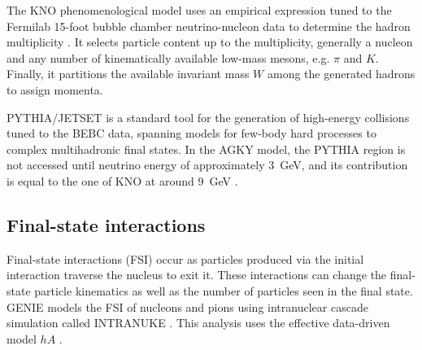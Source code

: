 
The KNO phenomenological model \cite{KNO_KOBA1972317} uses an empirical expression tuned to the Fermilab 15-foot bubble chamber neutrino-nucleon data to determine the hadron multiplicity \cite{AGKY_Yang_2009}. It selects particle content up to the multiplicity, generally a nucleon and any number of kinematically available low-mass mesons, e.g. $\pi$ and $K$. Finally, it partitions the available invariant mass $W$ among the generated hadrons to assign momenta. 

PYTHIA/JETSET \cite{Pythia_Sjostrand_2001} is a standard tool for the generation of high-energy collisions tuned to the BEBC data, spanning models for few-body hard processes to complex multihadronic final states. In the AGKY model, the PYTHIA region is not accessed until neutrino energy of approximately 3~GeV, and its contribution is equal to the one of KNO at around 9~GeV \cite{AGKY_Yang_2009}.



\subsection{Final-state interactions}

Final-state interactions (FSI) occur as particles produced via the initial interaction traverse the nucleus to exit it. These interactions can change the final-state particle kinematics as well as the number of particles seen in the final state. GENIE models the FSI of nucleons and pions using intranuclear cascade simulation called INTRANUKE \cite{OGIntranuke_PhysRevD.45.743, RevisionIntranuke}. This analysis uses the effective data-driven model $hA$ \cite{genie_ANDREOPOULOS201087, genie_andreopoulos2015}. 


